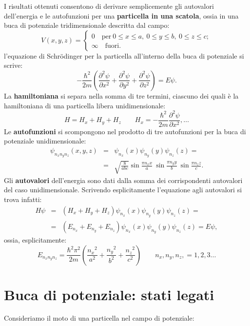 I risultati ottenuti consentono di derivare semplicemente gli autovalori dell'energia e le autofunzioni per una \textbf{particella in una scatola}, ossia in una buca di potenziale tridimensionale descritta dal campo:
\begin{equation}
V(x,y,z)= 
\begin{cases}
0 \quad \textrm{per}\ 0\leq x \leq a,\ 0\leq y \leq b,\ 0 \leq z \leq c;\\
\infty \quad \textrm{fuori.}
\end{cases}
\end{equation}
l'equazione di Schr\"{o}dinger per la particella all'interno della buca di potenziale si scrive:
\begin{equation}
-\frac{\hbar ^2}{2m} \left( \frac{\partial ^2 \psi}{\partial x^2}+\frac{\partial ^2 \psi}{\partial y^2}+\frac{\partial ^2 \psi}{\partial z^2}\right) = E \psi.
\end{equation}
La \textbf{hamiltoniana} si separa nella somma di tre termini, ciascuno dei quali è la  hamiltoniana di una particella libera unidimensionale:
\begin{equation}
H= H_x+H_y+H_z \qquad H_x= -\frac{\hbar ^2}{2m}  \frac{\partial ^2 \psi}{\partial x^2}, \dots
\end{equation}
Le \textbf{autofunzioni} si scompongono nel prodotto di tre autofunzioni per la buca di potenziale unidimensionale:
\begin{eqnarray}
\psi _{n_x n_y n_z} (x,y,z) &=& \psi _{n_x}(x)\psi _{n_y}(y)\psi _{n_z}(z)= \nonumber \\
&=&\sqrt{\frac{8}{abc}}\sin \frac{\pi n_x x}{a}\ \sin \frac{\pi n_y y}{b}\ \sin \frac{\pi n_z z}{c}.
\end{eqnarray}
Gli \textbf{autovalori} dell'energia sono dati dalla somma dei corrispondenti autovalori del caso unidimensionale. Scrivendo esplicitamente l'equazione agli autovalori si trova infatti:
\begin{eqnarray}
H\psi  &=& \left(H_x+H_y+H_z\right) \psi _{n_x}(x)\psi _{n_y}(y)\psi _{n_z}(z)= \nonumber \\
&=& \left( E_{n_x}+E_{n_y}+E_{n_z}\right) \psi _{n_x}(x)\psi _{n_y}(y)\psi _{n_z}(z)=  E\psi,
\end{eqnarray}
ossia, esplicitamente:
\begin{equation}
E_{n_x n_y n_z}=\frac{\hbar ^2 \pi^2}{2m} \left(\frac{{n_x}^2}{a^2}+\frac{{n_y}^2}{b^2}+\frac{{n_z}^2}{c^2}\right) \qquad n_x, n_y, n_z, = 1,2,3... 
\end{equation}
\section{Buca di potenziale: stati legati}
Consideriamo il moto di una particella nel campo di potenziale:\\

